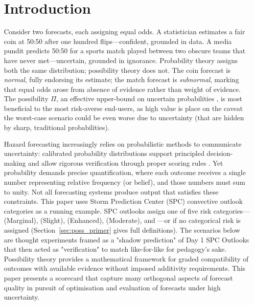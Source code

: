 
\section{Introduction}\label{sec:introduction}

Consider two forecasts, each assigning equal odds. A statistician
estimates a fair coin at 50:50 after one hundred flips---confident,
grounded in data. A media pundit predicts 50:50 for a
sports match played between two obscure teams that have
never met---uncertain, grounded
in ignorance. Probability theory assigns both the same distribution;
possibility theory does not. The coin forecast is \textit{normal},
fully endorsing its estimate; the match forecast is
\textit{subnormal}, marking that equal odds arose from absence of
evidence rather than weight of evidence.
The possibility $\Pi$,
an effective upper-bound on uncertain probabilities
\citep{Dubois1992-gd},
is most beneficial to the most risk-averse end-users,
as high value is place on the caveat the worst-case
scenario could be even worse due to uncertainty
(that are hidden by sharp, traditional probabilities).

Hazard forecasting increasingly relies on probabilistic methods to
communicate uncertainty: calibrated probability
distributions support principled decision-making and allow rigorous
verification through proper scoring rules
\citep{Hendrickson1971-lx,Gneiting2007-ob}.
Yet probability demands
precise quantification, where each outcome receives a single number
representing relative frequency (or belief), and those numbers
must sum to unity. Not all forecasting systems produce output that
satisfies these constraints. This paper uses Storm Prediction Center
(SPC) convective outlook categories as a running example. SPC
outlooks assign one of five risk categories--- (Marginal),
 (Slight),  (Enhanced),  (Moderate), and
---or  if no categorical risk is assigned
(Section~\ref{sec:poss_primer} gives full definitions). The scenarios
below are thought experiments framed as a
"shadow prediction" of Day 1 SPC Outlooks that then
acted as "verification" to match like-for-like
for pedagogy's sake.
Possibility theory \citep{Dubois1988-nh}
provides a mathematical framework for graded
compatibility of outcomes with available evidence
without imposed additivity requirements.
This paper presents a scorecard that capture many
orthogonal aspects of forecast quality in pursuit of
optimisation and evaluation of forecasts under high
uncertainty.

